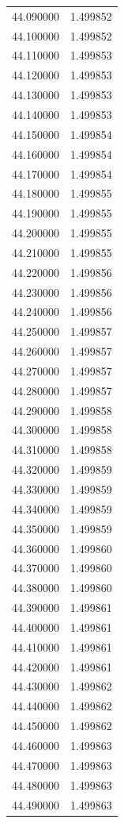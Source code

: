 \begin{tabular}{rr}
44.090000 & 1.499852 \\
44.100000 & 1.499852 \\
44.110000 & 1.499853 \\
44.120000 & 1.499853 \\
44.130000 & 1.499853 \\
44.140000 & 1.499853 \\
44.150000 & 1.499854 \\
44.160000 & 1.499854 \\
44.170000 & 1.499854 \\
44.180000 & 1.499855 \\
44.190000 & 1.499855 \\
44.200000 & 1.499855 \\
44.210000 & 1.499855 \\
44.220000 & 1.499856 \\
44.230000 & 1.499856 \\
44.240000 & 1.499856 \\
44.250000 & 1.499857 \\
44.260000 & 1.499857 \\
44.270000 & 1.499857 \\
44.280000 & 1.499857 \\
44.290000 & 1.499858 \\
44.300000 & 1.499858 \\
44.310000 & 1.499858 \\
44.320000 & 1.499859 \\
44.330000 & 1.499859 \\
44.340000 & 1.499859 \\
44.350000 & 1.499859 \\
44.360000 & 1.499860 \\
44.370000 & 1.499860 \\
44.380000 & 1.499860 \\
44.390000 & 1.499861 \\
44.400000 & 1.499861 \\
44.410000 & 1.499861 \\
44.420000 & 1.499861 \\
44.430000 & 1.499862 \\
44.440000 & 1.499862 \\
44.450000 & 1.499862 \\
44.460000 & 1.499863 \\
44.470000 & 1.499863 \\
44.480000 & 1.499863 \\
44.490000 & 1.499863 \\

\end{tabular}
